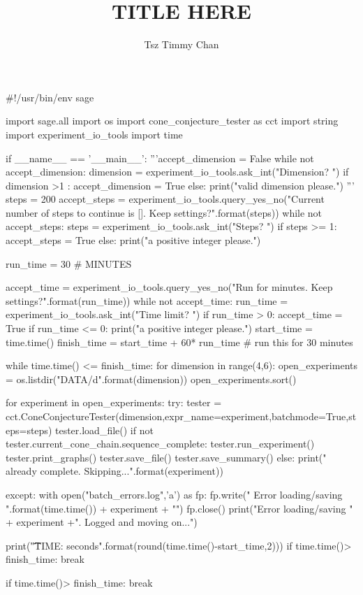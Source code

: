 \documentclass{TC}
\title{TITLE HERE}	%
\author{Tsz Timmy Chan}	%
\begin{document}
\begin{SAGE}
#!/usr/bin/env sage

import sage.all
import os
import cone_conjecture_tester as cct
import string
import experiment_io_tools
import time

if __name__ == '__main__':
	'''accept_dimension = False
	while not accept_dimension:
		dimension = experiment_io_tools.ask_int("Dimension? ")
		if dimension >1 :
			accept_dimension = True
		else:
			print("\tEnter valid dimension please.")
	'''
	steps = 200
	accept_steps = experiment_io_tools.query_yes_no("Current number of steps to continue is [{}]. Keep settings?".format(steps))
	while not accept_steps:
		steps = experiment_io_tools.ask_int("Steps? ")
		if steps >= 1:
			accept_steps = True
		else:
			print("\tEnter a positive integer please.")

	run_time = 30 # MINUTES

	accept_time = experiment_io_tools.query_yes_no("Run for {} minutes. Keep settings?".format(run_time))
	while not accept_time:
		run_time = experiment_io_tools.ask_int("Time limit? ")
		if run_time > 0:
			accept_time = True
		if run_time <= 0:
			print("\tEnter a positive integer please.")
	start_time = time.time()
	finish_time = start_time + 60* run_time # run this for 30 minutes

	while time.time() <= finish_time:
		for dimension in range(4,6):
			open_experiments = os.listdir("DATA/{}d".format(dimension))
			open_experiments.sort()
			
			for experiment in open_experiments:
				try:
					tester = cct.ConeConjectureTester(dimension,expr_name=experiment,batchmode=True,steps=steps)
					tester.load_file()
					if not tester.current_cone_chain.sequence_complete:
						tester.run_experiment()
						tester.print_graphs()
						tester.save_file()
						tester.save_summary()					
					else:
						print("{} already complete. Skipping...".format(experiment))
					
				except:
					with open("batch_errors.log",'a') as fp:
						fp.write("{} Error loading/saving ".format(time.time()) + experiment + "\n")
						fp.close()
					print("Error loading/saving " + experiment +". Logged and moving on...")
				
				print("\t\t\tRUN TIME: {} seconds".format(round(time.time()-start_time,2)))
				if time.time()> finish_time:
					break

			if time.time()> finish_time:
				break
\end{SAGE}
\end{document}
